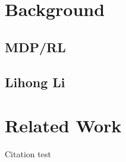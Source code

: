 \documentclass{article}
\begin{document}
\section{Background}

\subsection{MDP/RL}

\subsection{Lihong Li}







\section{Related Work}

Citation test~\cite{li2006towards}
\end{document}
